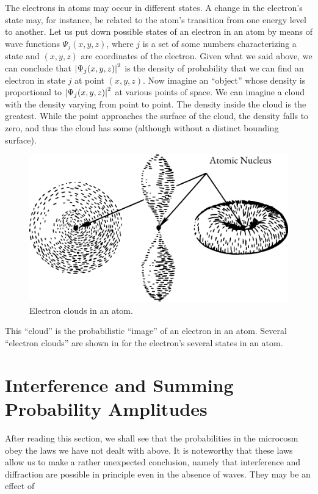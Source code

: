  The electrons in atoms may occur in
different states. A change in the electron's state may, for instance, be
related to the atom's transition from one energy level to another. Let us
put down possible states of an electron in an atom by means of wave
functions $\Psi_{j}(x, y, z)$, where $j$ is a set of some numbers characterizing a state and $(x, y, z)$ are coordinates of the electron. Given what we said above, we can conclude that $\abs{\Psi_{j}(x, y, z)}^{2}$ is the density of probability that we can find an electron in state $j$ at point $(x, y, z)$. Now imagine an ``object'' whose density is proportional to $\abs{\Psi_{j}(x, y, z)}^{2}$ at various points of space. We can imagine a cloud with the density varying from point to point. The density inside the cloud is the greatest. While the point approaches the surface of the cloud, the density falls to zero, and thus the cloud has some  (although without a distinct bounding surface).

\begin{figure}[!ht]
\centering
\includegraphics[width=0.8\tfwidth]{figures/orbitals.pdf}
\caption{ Electron clouds in an atom.\label{orbitals}}
\end{figure}

This ``cloud'' is the probabilistic ``image'' of an electron in an atom.
Several ``electron clouds'' are shown in  for the electron's several states in an atom.

\section{Interference and Summing Probability Amplitudes}

After reading this section, we shall see that the probabilities in the
microcosm obey the laws we have not dealt with above. It is noteworthy
that these laws allow us to make a rather unexpected conclusion,
namely that interference and diffraction are possible in principle even in
the absence of waves. They may be an effect of 

